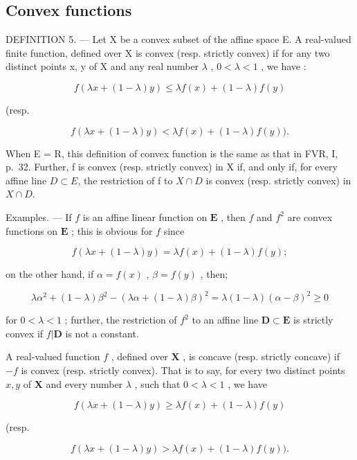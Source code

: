 \subsection{Convex functions}

DEFINITION 5. --- Let X be a convex subset of the affine space E. A real-valued finite function, defined over X is convex (resp. strictly convex) if for any two distinct points x, y of X and any real number \(\lambda\) , \(0 < \lambda < 1\) , we have :

\[
f (\lambda x + (1 - \lambda) y) \leqslant \lambda f (x) + (1 - \lambda) f (y)\tag{1}
\]

(resp.

\[
f (\lambda x + (1 - \lambda) y) <   \lambda f (x) + (1 - \lambda) f (y)).\tag{2}
\]

When E = R, this definition of convex function is the same as that in FVR, I, p.~32. Further, f is convex (resp. strictly convex) in X if, and only if, for every affine line \(D \subset E\), the restriction of f to \(X \cap D\) is convex (resp. strictly convex) in \(X \cap D\).

Examples. --- If \(f\) is an affine linear function on \(\mathbf{E}\) , then \(f\) and \(f^2\) are convex functions on \(\mathbf{E}\) ; this is obvious for \(f\) since

\[
f (\lambda x + (1 - \lambda) y) = \lambda f (x) + (1 - \lambda) f (y);
\]

on the other hand, if \(\alpha = f(x)\) , \(\beta = f(y)\) , then;

\[
\lambda \alpha^ {2} + (1 - \lambda) \beta^ {2} - (\lambda \alpha + (1 - \lambda) \beta) ^ {2} = \lambda (1 - \lambda) (\alpha - \beta) ^ {2} \geqslant 0
\]

for \(0 < \lambda < 1\) ; further, the restriction of \(f^2\) to an affine line \(\mathbf{D} \subset \mathbf{E}\) is strictly convex if \(f|\mathbf{D}\) is not a constant.

A real-valued function \(f\) , defined over \(\mathbf{X}\) , is concave (resp. strictly concave) if \(-f\) is convex (resp. strictly convex). That is to say, for every two distinct points \(x, y\) of \(\mathbf{X}\) and every number \(\lambda\) , such that \(0 < \lambda < 1\) , we have

\[
f (\lambda x + (1 - \lambda) y) \geqslant \lambda f (x) + (1 - \lambda) f (y)
\]

(resp.

\[
f (\lambda x + (1 - \lambda) y) > \lambda f (x) + (1 - \lambda) f (y)).
\]


